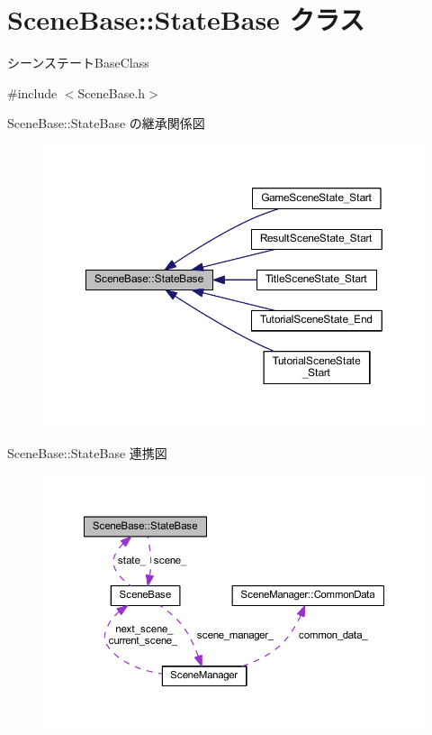 \hypertarget{class_scene_base_1_1_state_base}{}\section{Scene\+Base\+:\+:State\+Base クラス}
\label{class_scene_base_1_1_state_base}


シーンステート\+Base\+Class  




{\ttfamily \#include $<$Scene\+Base.\+h$>$}



Scene\+Base\+:\+:State\+Base の継承関係図
\nopagebreak
\begin{figure}[H]
\begin{center}
\leavevmode
\includegraphics[width=350pt]{class_scene_base_1_1_state_base__inherit__graph}
\end{center}
\end{figure}


Scene\+Base\+:\+:State\+Base 連携図
\nopagebreak
\begin{figure}[H]
\begin{center}
\leavevmode
\includegraphics[width=350pt]{class_scene_base_1_1_state_base__coll__graph}
\end{center}
\end{figure}
